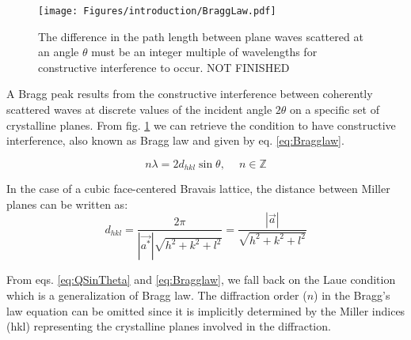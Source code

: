 \begin{figure}[!htb]
    \centering
    \texttt{[image: Figures/introduction/BraggLaw.pdf]}
    \caption{The difference in the path length between plane waves scattered at an angle $\theta$ must be an integer multiple of wavelengths for constructive interference to occur. NOT FINISHED}
    \label{fig:BraggLaw}
\end{figure}

A Bragg peak results from the constructive interference between coherently scattered waves at discrete values of the incident angle $2\theta$ on a specific set of crystalline planes.
From fig. \ref{fig:BraggLaw} we can retrieve the condition to have constructive interference, also known as Bragg law and given by eq. \eqref{eq:Bragglaw}.

\begin{equation}
    \label{eq:Bragglaw}
    n\lambda = 2d_{hkl} \sin{\theta}, \quad \ n \in \mathbb{Z}
\end{equation}


In the case of a cubic {\color{DarkOrange}face-centered} Bravais lattice, the distance between Miller planes can be written as:
\begin{equation}
    \label{eq:Interplanarspacing}
    d_{hkl}=\frac{2\pi}{|\vec{a^*}|\sqrt{h^2 + k^2 + l^2}}=\frac{|\vec{a}|}{\sqrt{h^2 + k^2 + l^2}}
\end{equation}

From eqs. \ref{eq:QSinTheta} and \ref{eq:Bragglaw}, we fall back on the Laue condition which is a generalization of Bragg law. The diffraction order ($n$) in the Bragg's law equation can be omitted since it is implicitly determined by the Miller indices (hkl) representing the crystalline planes involved in the diffraction.

